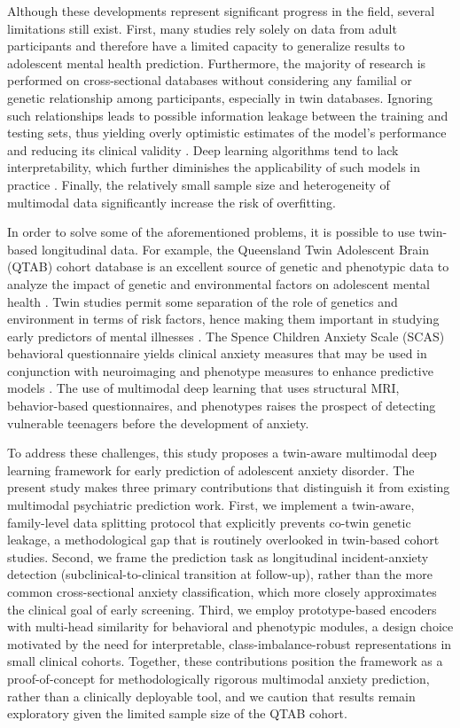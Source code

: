 \documentclass[10pt,letterpaper]{article}
\newcommand{\hlpar}[1]{\leavevmode\colorbox{yellow!30}{\parbox{\dimexpr\linewidth-2\fboxsep\relax}{#1}}\vspace{2pt}}
\begin{document}
        Although these developments represent significant progress in the field, several limitations still exist. First, many studies rely solely on data from adult participants and therefore have a limited capacity to generalize results to adolescent mental health prediction. Furthermore, the majority of research is performed on cross-sectional databases without considering any familial or genetic relationship among participants, especially in twin databases. Ignoring such relationships leads to possible information leakage between the training and testing sets, thus yielding overly optimistic estimates of the model's performance and reducing its clinical validity \cite{ref32,ref33,ref34}. Deep learning algorithms tend to lack interpretability, which further diminishes the applicability of such models in practice \cite{ref15,ref16}. Finally, the relatively small sample size and heterogeneity of multimodal data significantly increase the risk of overfitting.



        In order to solve some of the aforementioned problems, it is possible to use twin-based longitudinal data. For example, the Queensland Twin Adolescent Brain (QTAB) cohort database is an excellent source of genetic and phenotypic data to analyze the impact of genetic and environmental factors on adolescent mental health \cite{ref32}. Twin studies permit some separation of the role of genetics and environment in terms of risk factors, hence making them important in studying early predictors of mental illnesses \cite{ref33,ref34}. The Spence Children Anxiety Scale (SCAS) behavioral questionnaire yields clinical anxiety measures that may be used in conjunction with neuroimaging and phenotype measures to enhance predictive models \cite{ref35}. The use of multimodal deep learning that uses structural MRI, behavior-based questionnaires, and phenotypes raises the prospect of detecting vulnerable teenagers before the development of anxiety.

        \hlpar{To address these challenges, this study proposes a twin-aware multimodal deep learning framework for early prediction of adolescent anxiety disorder. The present study makes three primary contributions that distinguish it from existing multimodal psychiatric prediction work. First, we implement a twin-aware, family-level data splitting protocol that explicitly prevents co-twin genetic leakage, a methodological gap that is routinely overlooked in twin-based cohort studies. Second, we frame the prediction task as longitudinal incident-anxiety detection (subclinical-to-clinical transition at follow-up), rather than the more common cross-sectional anxiety classification, which more closely approximates the clinical goal of early screening. Third, we employ prototype-based encoders with multi-head similarity for behavioral and phenotypic modules, a design choice motivated by the need for interpretable, class-imbalance-robust representations in small clinical cohorts. Together, these contributions position the framework as a proof-of-concept for methodologically rigorous multimodal anxiety prediction, rather than a clinically deployable tool, and we caution that results remain exploratory given the limited sample size of the QTAB cohort.}
\end{document}
